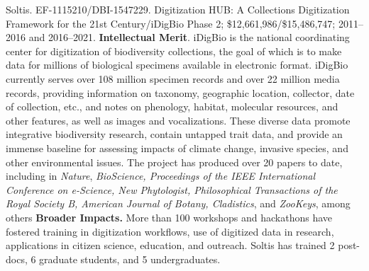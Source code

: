 \documentclass[11pt]{article}
\makeatletter
\renewcommand{\paragraph}{\@startsection{paragraph}{4}{\z@}
  {1.5ex \@plus 1ex \@minus .2ex}{-1em}
  {\normalfont\normalsize\it}
}
\makeatother
\begin{document}
\paragraph{Soltis.} EF-1115210/DBI-1547229. Digitization HUB: A Collections
Digitization Framework for the 21st Century/iDigBio Phase 2;
\$12,661,986/\$15,486,747; 2011--2016 and 2016--2021.
\textbf{Intellectual Merit}. iDigBio is the national coordinating center
for digitization of biodiversity collections, the goal of which is to
make data for millions of biological specimens available in electronic
format. iDigBio currently serves over 108 million specimen records and
over 22 million media records, providing information on taxonomy,
geographic location, collector, date of collection, etc., and notes on
phenology, habitat, molecular resources, and other features, as well as
images and vocalizations. These diverse data promote integrative
biodiversity research, contain untapped trait data, and provide an
immense baseline for assessing impacts of climate change, invasive
species, and other environmental issues. The project has produced over
20 papers to date, including in \emph{Nature}, \emph{BioScience,
Proceedings of the IEEE International Conference on e-Science, New
Phytologist, Philosophical Transactions of the Royal Society B, American
Journal of Botany, Cladistics}, and \emph{ZooKeys}, among others
\textbf{Broader Impacts.} More than 100 workshops and hackathons have
fostered training in digitization workflows, use of digitized data in
research, applications in citizen science, education, and outreach.
Soltis has trained 2 post-docs, 6 graduate students, and 5
undergraduates.


\vbox{}
\end{document}
